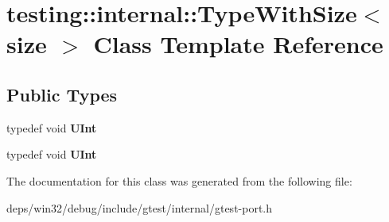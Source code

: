 \hypertarget{classtesting_1_1internal_1_1_type_with_size}{}\section{testing\+:\+:internal\+:\+:Type\+With\+Size$<$ size $>$ Class Template Reference}
\label{classtesting_1_1internal_1_1_type_with_size}
\subsection*{Public Types}
\begin{DoxyCompactItemize}
\item 
\hypertarget{classtesting_1_1internal_1_1_type_with_size_a3898640d9f6c1e18110eef90f47a5d7b}{}typedef void {\bfseries U\+Int}\label{classtesting_1_1internal_1_1_type_with_size_a3898640d9f6c1e18110eef90f47a5d7b}

\item 
\hypertarget{classtesting_1_1internal_1_1_type_with_size_a3898640d9f6c1e18110eef90f47a5d7b}{}typedef void {\bfseries U\+Int}\label{classtesting_1_1internal_1_1_type_with_size_a3898640d9f6c1e18110eef90f47a5d7b}

\end{DoxyCompactItemize}


The documentation for this class was generated from the following file\+:\begin{DoxyCompactItemize}
\item 
deps/win32/debug/include/gtest/internal/gtest-\/port.\+h\end{DoxyCompactItemize}
